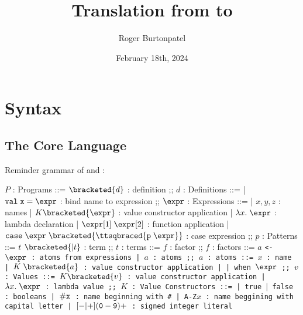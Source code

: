 \documentclass[]{article}
\title{Translation from \PPlus to \VMinus}
\author{Roger Burtonpatel}
\date{February 18th, 2024}
\begin{document}
\maketitle

\section{Syntax}

\subsection{The Core Language}

Reminder grammar of \PPlus and \VMinus: 

\bigskip

\begin{center}
    \begin{bnf}
    $P$ : \textsf{Programs} ::=
    $\bracketed{d}$ : definition
    ;;
    $d$ : \textsf{Definitions} ::=
    | $\tt{val} \; x \; \tt{=} \; \expr$ : bind name to expression
    ;;
    $\expr$ : Expressions ::= 
    | $x, y, z$ : names
    | $K\bracketed{\expr}$ : value constructor application 
    | $\lambda x. \; \expr$ : lambda declaration  
    | $\expr[1] \; \expr[2]$ : function application 
    | $\tt{case} \; \expr \; \bracketed{\ttsqbraced{p \; \expr}}$ : case expression 
    ;;
    $p$ : \textsf{Patterns} ::= $t$ $\bracketed{\vert t}$ : term
    ;;
    $t$ : terms ::= $f$  : factor
    ;;
    $f$ : factors ::= $a$ \tt{<-} $\expr$ : atoms from expressions 
        | $a$ : atoms 
    ;;
    $a$ : atoms ::= $x$ : name 
    | $K \; \bracketed{a}$ : value constructor application 
    | 
    | \tt{when} $\expr$
    ;;
    $v$ : Values ::= $K\bracketed{v}$ : value constructor application 
    | $\lambda x. \; \expr$ : lambda value 
    ;;
    $K$ : \textsf{Value Constructors} ::=
    | \tt{true} $\vert$ \tt{false} : booleans
    | $\tt{\#}x$ : name beginning with \tt{\#}
    | \tt{A-Z}$x$ : name beggining with capital letter
    | $[\tt{-}\vert\tt{+}](\tt{0}-\tt{9})+$ : signed integer literal 
    \end{bnf}
\end{center}

\bigskip 
\end{document}
